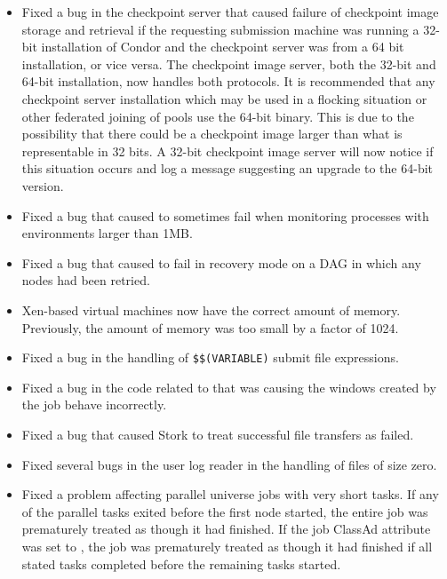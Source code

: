 \begin{itemize}

\item Fixed a bug in the checkpoint server that caused failure of
checkpoint image storage and retrieval if the requesting submission
machine was running a 32-bit installation of Condor and the checkpoint
server was from a 64 bit installation, or vice versa. The checkpoint
image server, both the 32-bit and 64-bit installation, now handles both
protocols. It is recommended that any checkpoint server installation which
may be used in a flocking situation or other federated joining of pools
use the 64-bit binary. This is due to the possibility that there could be
a checkpoint image larger than what is representable in 32 bits. A 32-bit
checkpoint image server will now notice if this situation occurs and log
a message suggesting an upgrade to the 64-bit version.

\item Fixed a bug that caused  to sometimes fail when monitoring
processes with environments larger than 1MB.

\item Fixed a bug that caused  to fail in recovery mode on
a DAG in which any nodes had been retried.

\item Xen-based virtual machines now have the correct amount of memory.
Previously, the amount of memory was too small by a factor of 1024.

\item Fixed a bug in the handling of \texttt{\$\$(VARIABLE)} submit
  file expressions.

\item Fixed a bug in the code related to  
  that was causing the windows created by the job behave incorrectly.

\item Fixed a bug that caused Stork to treat successful file transfers
as failed.

\item Fixed several bugs in the user log reader in the handling of
  files of size zero.

\item Fixed a problem affecting parallel universe jobs with very short
tasks.  If any of the parallel tasks exited before the first node
started, the entire job was prematurely treated as though it had
finished.  If the job ClassAd attribute  was
set to , the job was prematurely treated as though it
had finished if all stated tasks completed before the remaining tasks
started.

\end{itemize}

